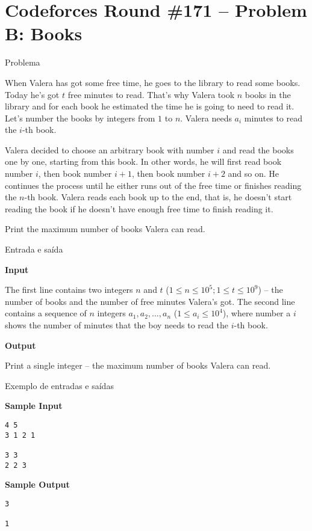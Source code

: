 \section{Codeforces Round \#171 -- Problem B: Books}

\begin{frame}[fragile]{Problema}

When Valera has got some free time, he goes to the library to read some books. Today he's got $t$
free minutes to read. That's why Valera took $n$ books in the library and for each book he 
estimated the time he is going to need to read it. Let's number the books by integers from $1$ to
$n$. Valera needs $a_i$ minutes to read the $i$-th book.

Valera decided to choose an arbitrary book with number $i$ and read the books one by one, starting
from this book. In other words, he will first read book number $i$, then book number $i + 1$, then
book number $i + 2$ and so on. He continues the process until he either runs out of the free time
or finishes reading the $n$-th book. Valera reads each book up to the end, that is, he doesn't
start reading the book if he doesn't have enough free time to finish reading it.

Print the maximum number of books Valera can read.
\end{frame}

\begin{frame}[fragile]{Entrada e saída}

\textbf{Input}

The first line contains two integers $n$ and $t$ ($1\leq n\leq 10^5; 1\leq t\leq 10^9$) -- the
number of books and the number of free minutes Valera's got. The second line contains a sequence
of $n$ integers $a_1, a_2, \ldots, a_n$ ($1\leq a_i\leq 10^4$), where number a $i$ shows the
number of minutes that the boy needs to read the $i$-th book.

\textbf{Output}

Print a single integer -- the maximum number of books Valera can read.

\end{frame}

\begin{frame}[fragile]{Exemplo de entradas e saídas}

\begin{minipage}[t]{0.5\textwidth}
\textbf{Sample Input}
\begin{verbatim}
4 5
3 1 2 1

3 3
2 2 3
\end{verbatim}
\end{minipage}
\begin{minipage}[t]{0.45\textwidth}
\textbf{Sample Output}
\begin{verbatim}
3

1
\end{verbatim}
\end{minipage}
\end{frame}

